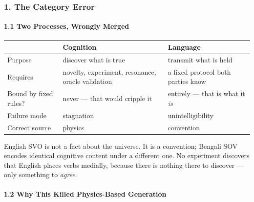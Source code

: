 \documentclass[
  11pt,
  a4paper,
]{article}
\begin{document}
\subsubsection{1. The Category Error}\label{the-category-error}

\paragraph{1.1 Two Processes, Wrongly
Merged}\label{two-processes-wrongly-merged}

\begin{longtable}[]{@{}
  >{\raggedright\arraybackslash}p{}
  >{\raggedright\arraybackslash}p{}
  >{\raggedright\arraybackslash}p{}@{}}
\toprule\noalign{}
\begin{minipage}[b]{\linewidth}\raggedright
\end{minipage} & \begin{minipage}[b]{\linewidth}\raggedright
Cognition
\end{minipage} & \begin{minipage}[b]{\linewidth}\raggedright
Language
\end{minipage} \\
\midrule\noalign{}
\endhead
\bottomrule\noalign{}
\endlastfoot
Purpose & discover what is true & transmit what is held \\
Requires & novelty, experiment, resonance, oracle validation & a fixed
protocol both parties know \\
Bound by fixed rules? & never --- that would cripple it & entirely ---
that is what it \emph{is} \\
Failure mode & stagnation & unintelligibility \\
Correct source & physics & convention \\
\end{longtable}

English SVO is not a fact about the universe. It is a convention;
Bengali SOV encodes identical cognitive content under a different one.
No experiment discovers that English places verbs medially, because
there is nothing there to discover --- only something to \emph{agree}.

\paragraph{1.2 Why This Killed Physics-Based
Generation}\label{why-this-killed-physics-based-generation}
\end{document}
